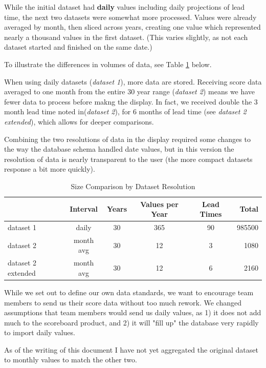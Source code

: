 \documentclass[logos,parttoc,morelanguage=french,morelanguage=german]{orsay-memoire}
\begin{document}
While the initial dataset had \textbf{daily} values including daily projections of lead time, the next two datasets were somewhat more processed. Values were already averaged by month, then sliced across years, creating one value which represented nearly a thousand values in the first dataset. (This varies slightly, as not each dataset started and finished on the same date.)

To illustrate the differences in volumes of data, see Table \ref{tbl:origDatasetCompare} below.

When using daily datasets (\textit{dataset 1}), more data are stored. Receiving score data averaged to one month from the entire 30 year range (\textit{dataset 2}) means we have fewer data to process before makng the display. In fact, we received double the 3 month lead time noted in(\textit{dataset 2}), for 6 months of lead time (see \textit{dataset 2 extended}), which allows for deeper comparisons.

Combining the two resolutions of data in the display required some changes to the way the database schema handled date values, but in this version the resolution of data is nearly transparent to the user (the more compact datasets response a bit more quickly).

\begin{table}[h]
\centering
\begin{tabular}{@{}lccccr@{}}
\toprule
 & Interval & Years & Values per Year & Lead Times & Total \\ \midrule
dataset 1 & daily & 30 & 365 & 90 & 985500 \\
dataset 2 & month avg & 30 & 12 & 3 & 1080 \\
dataset 2 extended & month avg & 30 & 12 & 6 & 2160 \\ \bottomrule
\end{tabular}
\caption{Size Comparison by Dataset Resolution}
\label{tbl:origDatasetCompare}
\end{table}

While we set out to define our own data standards, we want to encourage team members to send us their score data without too much rework. We changed assumptions that team members would send us daily values, as 1) it does not add much to the scoreboard product, and 2) it will "fill up" the database very rapidly to import daily values.

As of the writing of this document I have not yet aggregated the original dataset to monthly values to match the other two.
\end{document}
